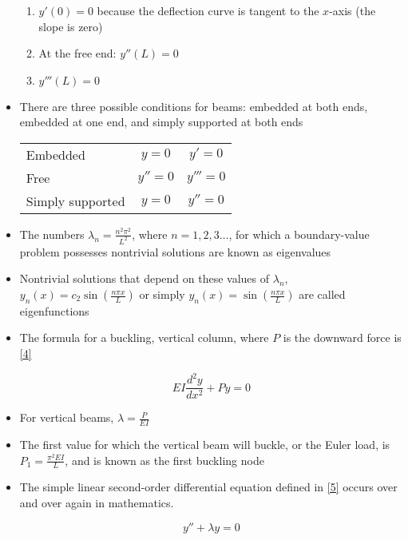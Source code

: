 \documentclass[12pt]{article}
\begin{document}
\begin{itemize}
\begin{enumerate}
        \item $y'(0)=0$ because the deflection curve is tangent to the $x$-axis (the slope is zero)

        \item At the free end: $y''(L)=0$

        \item $y'''(L)=0$

      \end{enumerate}

    \item There are three possible conditions for beams: embedded at both ends, embedded at one end, and simply supported at both ends

      \begin{tabular}[h]{l c c}
        Embedded & $y=0$ & $y'=0$\\
        Free & $y''=0$ & $y'''=0$\\
        Simply supported & $y=0$ & $y''=0$
      \end{tabular}

    \item The numbers $\lambda_n=\frac{n^2\pi^2}{L^2}$, where $n=1,2,3\dots$, for which a boundary-value problem possesses nontrivial solutions are known as eigenvalues

    \item Nontrivial solutions that depend on these values of $\lambda_n$, $y_n(x)=c_2\sin\left(\frac{n\pi x}{L}\right)$ or simply $y_n(x)=\sin\left( \frac{n\pi x}{L} \right)$ are called eigenfunctions 
    
    \item The formula for a buckling, vertical column, where $P$ is the downward force is \eqref{4}

      \begin{equation}
        EI\frac{d^2y}{dx^2}+Py=0
        \label{4}
      \end{equation}

    \item For vertical beams, $\lambda=\frac{P}{EI}$

    \item The first value for which the vertical beam will buckle, or the Euler load, is $P_1=\frac{\pi^2EI}{L}$, and is known as the first buckling node

    \item The simple linear second-order differential equation defined in \eqref{5} occurs over and over again in mathematics. 

      \begin{equation}
        y''+\lambda y=0
        \label{5}
      \end{equation}

\end{itemize}
\end{document}

